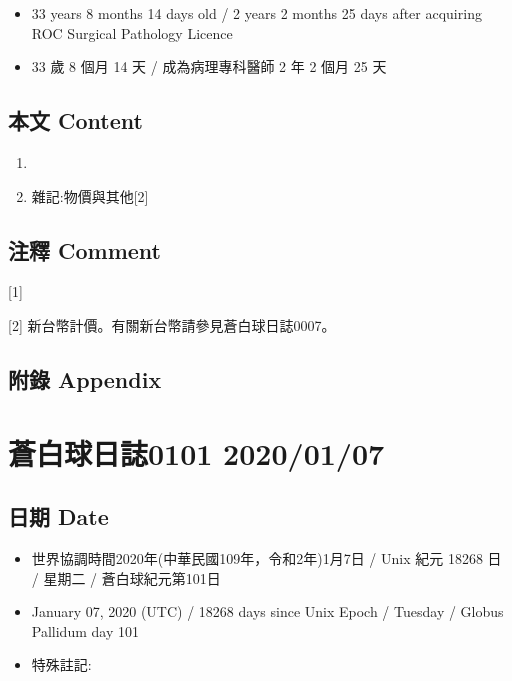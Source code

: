 \documentclass[
]{article}
\providecommand{\tightlist}{%
  \setlength{\itemsep}{0pt}\setlength{\parskip}{0pt}}
\begin{document}
\begin{itemize}
\tightlist
\item
  33 years 8 months 14 days old / 2 years 2 months 25 days after
  acquiring ROC Surgical Pathology Licence
\item
  33 歲 8 個月 14 天 / 成為病理專科醫師 2 年 2 個月 25 天
\end{itemize}

\hypertarget{ux672cux6587-content-5}{%
\subsection{本文 Content}\label{ux672cux6587-content-5}}

\begin{enumerate}
\def\labelenumi{\arabic{enumi}.}
\item
\item
  雜記:物價與其他{[}2{]}
\end{enumerate}

\hypertarget{ux6ce8ux91cb-comment-5}{%
\subsection{注釋 Comment}\label{ux6ce8ux91cb-comment-5}}

{[}1{]}

{[}2{]} 新台幣計價。有關新台幣請參見蒼白球日誌0007。

\hypertarget{ux9644ux9304-appendix-5}{%
\subsection{附錄 Appendix}\label{ux9644ux9304-appendix-5}}

\hypertarget{ux84bcux767dux7403ux65e5ux8a8c0101-20200107}{%
\section{蒼白球日誌0101
2020/01/07}\label{ux84bcux767dux7403ux65e5ux8a8c0101-20200107}}

\hypertarget{ux65e5ux671f-date-6}{%
\subsection{日期 Date}\label{ux65e5ux671f-date-6}}

\begin{itemize}
\tightlist
\item
  世界協調時間2020年(中華民國109年，令和2年)1月7日 / Unix 紀元 18268 日
  / 星期二 / 蒼白球紀元第101日
\item
  January 07, 2020 (UTC) / 18268 days since Unix Epoch / Tuesday /
  Globus Pallidum day 101
\item
  特殊註記:
\end{itemize}
\end{document}

